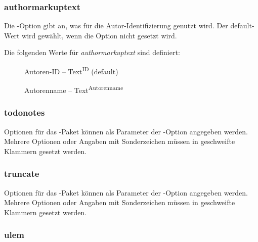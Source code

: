\subsubsection{authormarkuptext}


Die -Option gibt an, was für die Autor-Identifizierung genutzt wird.
Der default-Wert wird gewählt, wenn die Option nicht gesetzt wird.

Die folgenden Werte für \emph{authormarkuptext} sind definiert:

\begin{description}
	\item [] Autoren-ID -- Text\textsuperscript{ID} (default)
	\item [] Autorenname -- Text\textsuperscript{Autorenname}
\end{description}



\subsubsection{todonotes}


Optionen für das -Paket können als Parameter der -Option angegeben werden.
Mehrere Optionen oder Angaben mit Sonderzeichen müssen in geschweifte Klammern gesetzt werden.




\subsubsection{truncate}


Optionen für das -Paket können als Parameter der -Option angegeben werden.
Mehrere Optionen oder Angaben mit Sonderzeichen müssen in geschweifte Klammern gesetzt werden.




\subsubsection{ulem}

